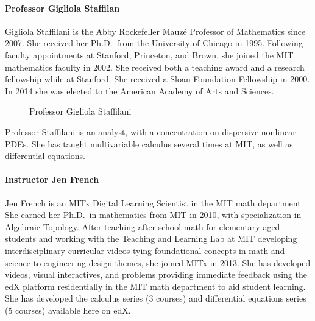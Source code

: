 \documentclass[pdftex, brazil, 12pt, twoside]{article}
\begin{document}
\paragraph{Professor Gigliola Staffilan}
Gigliola Staffilani is the Abby Rockefeller Mauzé Professor of Mathematics since 2007.
She received her Ph.D.\ from the University of Chicago in 1995. Following faculty
appointments at Stanford, Princeton, and Brown, she joined the MIT mathematics faculty
in 2002. She received both a teaching award and a research fellowship while at Stanford.
She received a Sloan Foundation Fellowship in 2000. In 2014 she was elected to the
American Academy of Arts and Sciences.

\begin{figure}[H]
  \begin{center}
    \caption{Professor Gigliola Staffilani}
    \label{fig:gigliola}
  \end{center}
\end{figure}

Professor Staffilani is an analyst, with a concentration on dispersive nonlinear PDEs.
She has taught multivariable calculus several times at MIT, as well as differential
equations.

\paragraph{Instructor Jen French}
Jen French is an MITx Digital Learning Scientist in the MIT math department. She earned
her Ph.D.\ in mathematics from MIT in 2010, with specialization in Algebraic Topology.
After teaching after school math for elementary aged students and working with the
Teaching and Learning Lab at MIT developing interdisciplinary curricular videos tying
foundational concepts in math and science to engineering design themes, she joined
MITx in 2013. She has developed videos, visual interactives, and problems providing
immediate feedback using the edX platform residentially in the MIT math department
to aid student learning. She has developed the calculus series (3 courses) and differential
equations series (5 courses) available here on edX.
\end{document}
